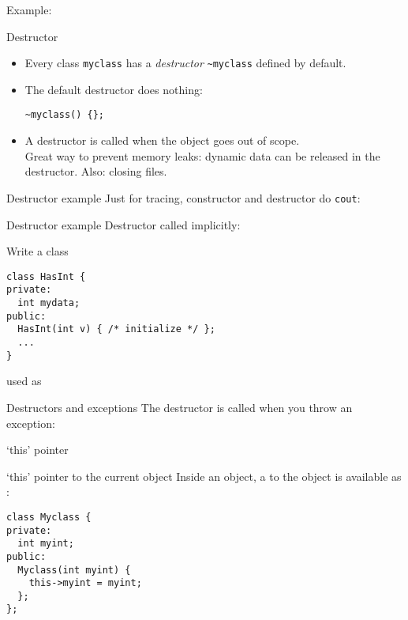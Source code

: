 Example:
%

\begin{slide}{Destructor}
  \label{sl:class-destruct}
  \begin{itemize}
  \item Every class \lstinline{myclass} has a \emph{destructor} \lstinline{~myclass}
    defined by default.
  \item The default destructor does nothing:
\begin{lstlisting}
~myclass() {};
\end{lstlisting}
\item A destructor is called when the object goes out of scope.\\
  Great way to prevent memory leaks: dynamic data can be released
  in the destructor. Also: closing files.
\end{itemize}
\end{slide}

\begin{slide}{Destructor example}
  \label{sl:class-destruct-ex1}
  Just for tracing, constructor and destructor do \lstinline{cout}:
\end{slide}

\begin{slide}{Destructor example}
  \label{sl:class-destruct-ex2}
  Destructor called implicitly:
\end{slide}

\begin{exercise}
  \label{ex:destruct-trace}
  Write a class
\begin{lstlisting}
class HasInt {
private:
  int mydata;
public:
  HasInt(int v) { /* initialize */ };
  ...
}
\end{lstlisting}
used as
%
\end{exercise}

\begin{block}{Destructors and exceptions}
  \label{sl:exceptobj}
  The destructor is called when you throw an exception:
\end{block}

 {`this' pointer}

\begin{block}{`this' pointer to the current object}
  \label{sl:class-this}
  Inside an object, a  to the object is available
  as :
\begin{lstlisting}
class Myclass {
private:
  int myint;
public:
  Myclass(int myint) {
    this->myint = myint;
  };
};
\end{lstlisting}
\end{block}

